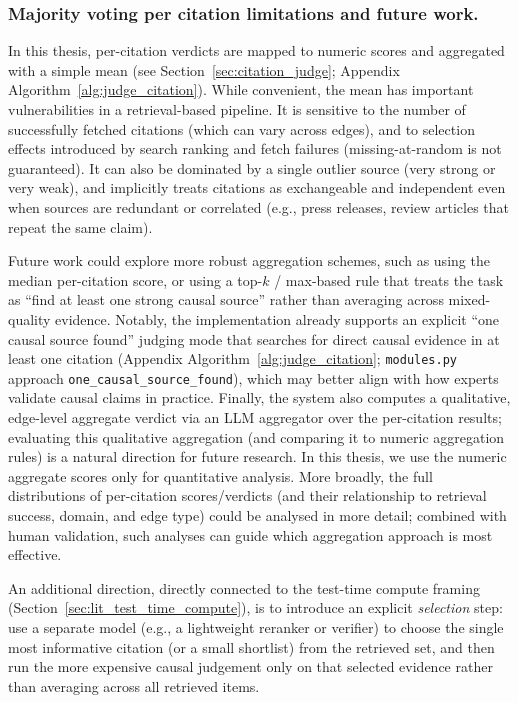 \subsubsection{Majority voting per citation limitations and future work.}
In this thesis, per-citation verdicts are mapped to numeric scores and aggregated with a simple mean (see Section~\ref{sec:citation_judge}; Appendix Algorithm~\ref{alg:judge_citation}). While convenient, the mean has important vulnerabilities in a retrieval-based pipeline. It is sensitive to the number of successfully fetched citations (which can vary across edges), and to selection effects introduced by search ranking and fetch failures (missing-at-random is not guaranteed). It can also be dominated by a single outlier source (very strong or very weak), and implicitly treats citations as exchangeable and independent even when sources are redundant or correlated (e.g., press releases, review articles that repeat the same claim).

Future work could explore more robust aggregation schemes, such as using the median per-citation score, or using a top-$k$ / max-based rule that treats the task as ``find at least one strong causal source'' rather than averaging across mixed-quality evidence. Notably, the implementation already supports an explicit ``one causal source found'' judging mode that searches for direct causal evidence in at least one citation (Appendix Algorithm~\ref{alg:judge_citation}; \texttt{modules.py} approach \texttt{one\_causal\_source\_found}), which may better align with how experts validate causal claims in practice. Finally, the system also computes a qualitative, edge-level aggregate verdict via an LLM aggregator over the per-citation results; evaluating this qualitative aggregation (and comparing it to numeric aggregation rules) is a natural direction for future research. In this thesis, we use the numeric aggregate scores only for quantitative analysis. More broadly, the full distributions of per-citation scores/verdicts (and their relationship to retrieval success, domain, and edge type) could be analysed in more detail; combined with human validation, such analyses can guide which aggregation approach is most effective.

An additional direction, directly connected to the test-time compute framing (Section~\ref{sec:lit_test_time_compute}), is to introduce an explicit \emph{selection} step: use a separate model (e.g., a lightweight reranker or verifier) to choose the single most informative citation (or a small shortlist) from the retrieved set, and then run the more expensive causal judgement only on that selected evidence rather than averaging across all retrieved items.

